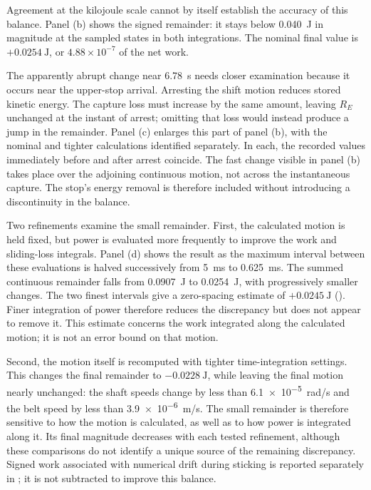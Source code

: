 \documentclass[11pt]{report}
\numberwithin{equation}{section}
\begin{document}
Agreement at the kilojoule scale cannot by itself establish the accuracy of
this balance. Panel (b) shows the signed remainder: it stays below
\SI{0.040}{J} in magnitude at the sampled states in both integrations. The
nominal final value is \(+0.0254~\mathrm{J}\), or
\(4.88\times10^{-7}\) of the net work.

The apparently abrupt change near \SI{6.78}{s} needs closer examination
because it occurs near the upper-stop arrival. Arresting the shift motion
reduces stored kinetic energy. The capture loss must increase by the same
amount, leaving \(R_E\) unchanged at the instant of arrest; omitting that loss
would instead produce a jump in the remainder. Panel (c) enlarges this part
of panel (b), with the nominal and tighter calculations identified separately.
In each, the recorded values immediately before and after arrest coincide. The fast
change visible in panel (b) takes place over the adjoining continuous motion,
not across the instantaneous capture. The stop's energy removal is therefore
included without introducing a discontinuity in the balance.

Two refinements examine the small remainder. First, the calculated motion is
held fixed, but power is evaluated more frequently to improve the work and
sliding-loss integrals. Panel (d) shows the result as the maximum interval
between these evaluations is halved successively from \SI{5}{ms} to
\SI{0.625}{ms}. The summed continuous remainder falls from \SI{0.0907}{J}
to \SI{0.0254}{J}, with progressively smaller changes. The two finest
intervals give a zero-spacing estimate of \(+0.0245~\mathrm{J}\)
(). Finer integration of power therefore
reduces the discrepancy but does not appear to remove it. This estimate
concerns the work integrated along the calculated motion; it is not an error
bound on that motion.

Second, the motion itself is recomputed with tighter time-integration
settings. This changes the final remainder to \(-0.0228~\mathrm{J}\), while
leaving the final motion nearly unchanged: the shaft speeds change by less
than \SI{6.1e-5}{rad/s} and the belt speed by less than \SI{3.9e-6}{m/s}.
The small remainder is therefore sensitive to how the motion is calculated,
as well as to how power is integrated along it. Its final magnitude decreases
with each tested refinement, although these comparisons do not identify a
unique source of the remaining discrepancy. Signed work associated with
numerical drift during sticking is reported separately in ; it is not
subtracted to improve this balance.
\end{document}
